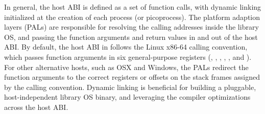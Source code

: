 In general, the host ABI is defined as a set of function calls, with dynamic linking initialized at the creation of each process (or picoprocess).
The platform adaption layers (PALs)
are responsible for
resolving the calling addresses inside the library OS, and passing the function arguments and return values in and out of the host ABI.
By default, the host ABI in \graphene{} follows the Linux x86-64 calling convention,
which passes function arguments in six general-purpose registers (, , , , , and ).
For other alternative hosts,
such as OSX and Windows, the PALs redirect
the function arguments to the correct registers or offsets on the stack frames assigned by the calling convention.
Dynamic linking is beneficial for
building a pluggable, host-independent library OS binary, and leveraging the compiler optimizations across the host ABI.









